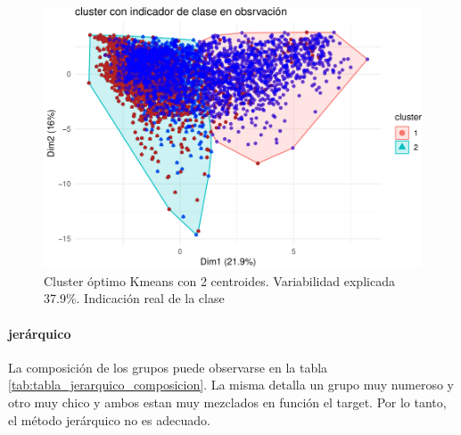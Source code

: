 \begin{figure}[!htb]
	\centering
	\includegraphics{imagenes/modelo_clusters/unnamed-chunk-21-1.pdf}
	\caption{Cluster óptimo Kmeans con 2 centroides. Variabilidad explicada 37.9\%. Indicación real de la clase}
	\label{fig:kmeans_cluster_optimo_composicion}
\end{figure}



\paragraph{\textbf{jerárquico}}

La composición de los grupos puede observarse en la tabla \ref{tab:tabla_jerarquico_composicion}. La misma detalla un grupo muy numeroso y otro muy chico y
ambos estan muy mezclados en función el target. Por lo tanto, el método
jerárquico no es adecuado.

\begin{table}[!h]
	
	\caption{\label{tab:tabla_jerarquico_composicion}Composición de clusters según la clase deserto}
	\centering
\end{table}


